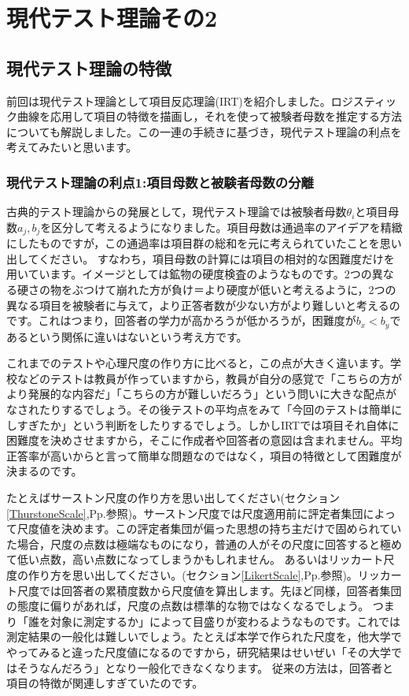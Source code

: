 \documentclass{ltjsbook}
\begin{document}
\chapter{現代テスト理論その2}
\label{x05_GRM}

\section{現代テスト理論の特徴}
前回は現代テスト理論として項目反応理論(IRT)を紹介しました。ロジスティック曲線を応用して項目の特徴を描画し，それを使って被験者母数を推定する方法についても解説しました。この一連の手続きに基づき，現代テスト理論の利点を考えてみたいと思います。
\subsection{現代テスト理論の利点1:項目母数と被験者母数の分離}
古典的テスト理論からの発展として，現代テスト理論では被験者母数$\theta_i$と項目母数$a_j, b_j$を区分して考えるようになりました。項目母数は通過率のアイデアを精緻にしたものですが，この通過率は項目群の総和を元に考えられていたことを思い出してください。
すなわち，項目母数の計算には項目の相対的な困難度だけを用いています。イメージとしては鉱物の硬度検査のようなものです。2つの異なる硬さの物をぶつけて崩れた方が負け＝より硬度が低いと考えるように，2つの異なる項目を被験者に与えて，より正答者数が少ない方がより難しいと考えるのです。これはつまり，回答者の学力が高かろうが低かろうが，困難度が$b_x < b_y$であるという関係に違いはないという考え方です。

これまでのテストや心理尺度の作り方に比べると，この点が大きく違います。学校などのテストは教員が作っていますから，教員が自分の感覚で「こちらの方がより発展的な内容だ」「こちらの方が難しいだろう」という問いに大きな配点がなされたりするでしょう。その後テストの平均点をみて「今回のテストは簡単にしすぎたか」という判断をしたりするでしょう。しかしIRTでは項目それ自体に困難度を決めさせますから，そこに作成者や回答者の意図は含まれません。平均正答率が高いからと言って簡単な問題なのではなく，項目の特徴として困難度が決まるのです。

たとえばサーストン尺度の作り方を思い出してください(セクション\ref{ThurstoneScale},Pp.\pageref{ThurstoneScale}参照)。サーストン尺度では尺度適用前に評定者集団によって尺度値を決めます。この評定者集団が偏った思想の持ち主だけで固められていた場合，尺度の点数は極端なものになり，普通の人がその尺度に回答すると極めて低い点数，高い点数になってしまうかもしれません。
あるいはリッカート尺度の作り方を思い出してください。(セクション\ref{LikertScale},Pp.\pageref{LikertScale}参照)。リッカート尺度では回答者の累積度数から尺度値を算出します。先ほど同様，回答者集団の態度に偏りがあれば，尺度の点数は標準的な物ではなくなるでしょう。
つまり「誰を対象に測定するか」によって目盛りが変わるようなものです。これでは測定結果の一般化は難しいでしょう。たとえば本学で作られた尺度を，他大学でやってみると違った尺度値になるのですから，研究結果はせいぜい「その大学ではそうなんだろう」となり一般化できなくなります。
従来の方法は，回答者と項目の特徴が関連しすぎていたのです。
\end{document}
